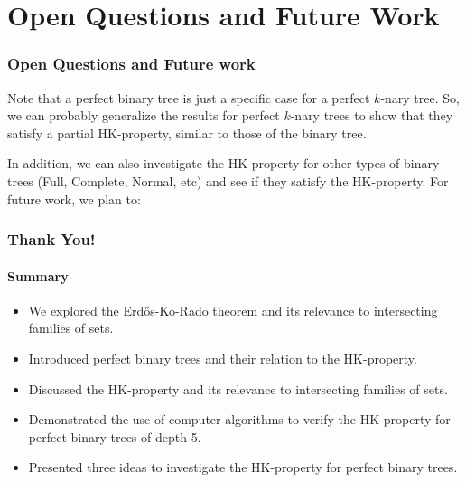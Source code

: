\documentclass[10pt,]{beamer}
\theoremstyle{conjectureStyle}
\theoremstyle{notationStyle}
\theoremstyle{claimStyle}
\begin{document}
\section{Open Questions and Future Work}
\begin{frame}\frametitle{Open Questions and Future work}
    Note that a perfect binary tree is just a specific case for a perfect $k$-nary tree. So, we can probably generalize the results for perfect $k$-nary trees to show that they satisfy a partial HK-property, similar to those of the binary tree.

    In addition, we can also investigate the HK-property for other types of binary trees (Full, Complete, Normal, etc) and see if they satisfy the HK-property.
    For future work, we plan to:
\end{frame}



\begin{frame}\frametitle{Thank You!}
    \framesubtitle{Summary}
    \begin{itemize}
        \item We explored the Erdős-Ko-Rado theorem and its relevance to intersecting families of sets.
        \item Introduced perfect binary trees and their relation to the HK-property.
        \item Discussed the HK-property and its relevance to intersecting families of sets.
        \item Demonstrated the use of computer algorithms to verify the HK-property for perfect binary trees of depth 5.
        \item Presented three ideas to investigate the HK-property for perfect binary trees.
    \end{itemize}
\end{frame}
\end{document}
